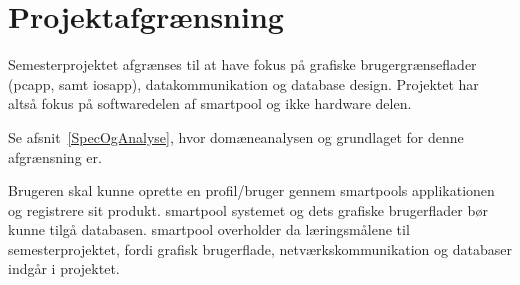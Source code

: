 \section{Projektafgrænsning}
Semesterprojektet afgrænses til at have fokus på grafiske brugergrænseflader (\gls{pcapp}, samt \gls{iosapp}), datakommunikation og database design. Projektet har altså fokus på softwaredelen af \gls{smartpool} og ikke hardware delen.

Se afsnit~\ref{SpecOgAnalyse}, hvor domæneanalysen og grundlaget for denne afgrænsning er.

Brugeren skal kunne oprette en profil/bruger gennem \glspl{smartpool} applikationen og registrere sit produkt. \gls{smartpool} systemet og dets grafiske brugerflader bør kunne tilgå databasen. \gls{smartpool} overholder da læringsmålene til semesterprojektet, fordi grafisk brugerflade, netværkskommunikation og databaser indgår i projektet.

